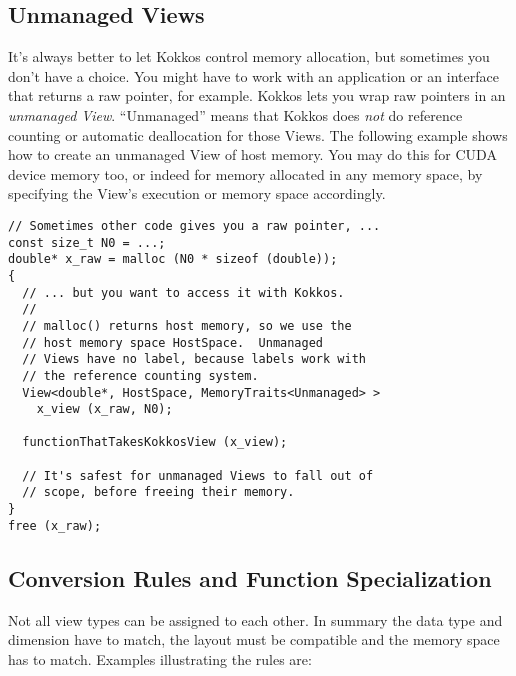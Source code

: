 \subsection{Unmanaged Views}

It's always better to let Kokkos control memory allocation, but
sometimes you don't have a choice.  You might have to work with an
application or an interface that returns a raw pointer, for example.
Kokkos lets you wrap raw pointers in an \emph{unmanaged View}.
``Unmanaged'' means that Kokkos does \emph{not} do reference counting
or automatic deallocation for those Views.  The following example
shows how to create an unmanaged View of host memory.  You may do this
for CUDA device memory too, or indeed for memory allocated in any
memory space, by specifying the View's execution or memory space
accordingly.
\begin{lstlisting}
// Sometimes other code gives you a raw pointer, ...
const size_t N0 = ...;
double* x_raw = malloc (N0 * sizeof (double));
{
  // ... but you want to access it with Kokkos.
  //
  // malloc() returns host memory, so we use the 
  // host memory space HostSpace.  Unmanaged
  // Views have no label, because labels work with
  // the reference counting system.
  View<double*, HostSpace, MemoryTraits<Unmanaged> > 
    x_view (x_raw, N0);

  functionThatTakesKokkosView (x_view);

  // It's safest for unmanaged Views to fall out of
  // scope, before freeing their memory.
}
free (x_raw);
\end{lstlisting}

\subsection{Conversion Rules and Function Specialization}

Not all view types can be assigned to each other. In summary
the data type and dimension have to match, the layout must be
compatible and the memory space has to match. Examples illustrating
the rules are:

